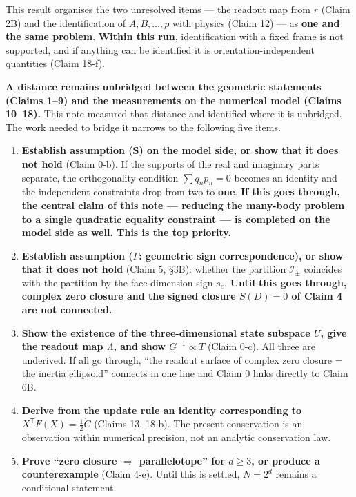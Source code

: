 \documentclass[
  10pt,
]{article}
\providecommand{\tightlist}{%
  \setlength{\itemsep}{0pt}\setlength{\parskip}{0pt}}
\begin{document}
This result organises the two unresolved items --- the readout map from
\(r\) (Claim 2B) and the identification of \(A,B,\dots,p\) with physics
(Claim 12) --- as \textbf{one and the same problem}. \textbf{Within this
run}, identification with a fixed frame is not supported, and if
anything can be identified it is orientation-independent quantities
(Claim 18-f).

\textbf{A distance remains unbridged between the geometric statements
(Claims 1--9) and the measurements on the numerical model (Claims
10--18).} This note measured that distance and identified where it is
unbridged. The work needed to bridge it narrows to the following five
items.

\begin{enumerate}
\def\labelenumi{\arabic{enumi}.}
\tightlist
\item
  \textbf{Establish assumption (S) on the model side, or show that it
  does not hold} (Claim 0-b). If the supports of the real and imaginary
  parts separate, the orthogonality condition \(\sum q_np_n=0\) becomes
  an identity and the independent constraints drop from two to
  \textbf{one}. \textbf{If this goes through, the central claim of this
  note --- reducing the many-body problem to a single quadratic equality
  constraint --- is completed on the model side as well. This is the top
  priority.}
\item
  \textbf{Establish assumption (\(\Gamma\): geometric sign
  correspondence), or show that it does not hold} (Claim 5, §3B):
  whether the partition \(\mathcal{I}_\pm\) coincides with the partition
  by the face-dimension sign \(s_e\). \textbf{Until this goes through,
  complex zero closure and the signed closure \(S(D)=0\) of Claim 4 are
  not connected.}
\item
  \textbf{Show the existence of the three-dimensional state subspace
  \(U\), give the readout map \(\Lambda\), and show \(G^{-1}\propto T\)}
  (Claim 0-c). All three are underived. If all go through, ``the readout
  surface of complex zero closure = the inertia ellipsoid'' connects in
  one line and Claim 0 links directly to Claim 6B.
\item
  \textbf{Derive from the update rule an identity corresponding to
  \(X^{\mathsf T}F(X)=\tfrac12\dot C\)} (Claims 13, 18-b). The present
  conservation is an observation within numerical precision, not an
  analytic conservation law.
\item
  \textbf{Prove ``zero closure \(\Rightarrow\) parallelotope'' for
  \(d\ge3\), or produce a counterexample} (Claim 4-e). Until this is
  settled, \(N=2^d\) remains a conditional statement.
\end{enumerate}
\end{document}
